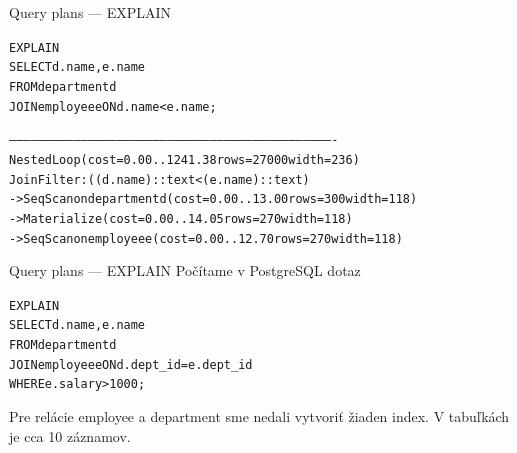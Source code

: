 \documentclass[12pt]{beamer}
\begin{document}
\begin{frame}[fragile]{Query plans --- EXPLAIN}
\begin{alltt}
\alert{EXPLAIN}
SELECT d.name, e.name
FROM department d
JOIN employee e ON d.name < e.name;
\end{alltt}
\scriptsize
\begin{alltt}
----------------------------------------------------------------------------------------------------------------------------------------
Nested Loop  (cost=0.00..1241.38 rows=27000 width=236)
Join Filter: ((d.name)::text < (e.name)::text)
  ->  Seq Scan on department d  (cost=0.00..13.00 rows=300 width=118)
  ->  Materialize  (cost=0.00..14.05 rows=270 width=118)
        ->  Seq Scan on employee e  (cost=0.00..12.70 rows=270 width=118)
\end{alltt}
\end{frame}

\begin{frame}[fragile]{Query plans --- EXPLAIN}
Počítame v PostgreSQL dotaz
\begin{alltt}
\alert{EXPLAIN}
SELECT d.name, e.name
FROM department d
JOIN employee e ON d.dept_id = e.dept_id
WHERE e.salary > 1000;
\end{alltt}
Pre relácie employee a department sme nedali vytvoriť žiaden index.
V tabuľkách je cca 10 záznamov.
\end{frame}
\end{document}
